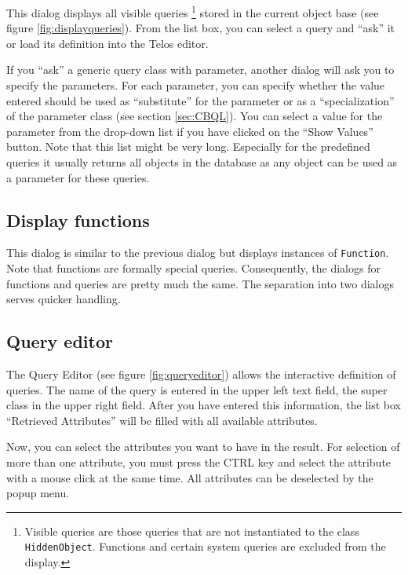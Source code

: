 This dialog displays all visible queries%
\footnote{Visible queries are those queries that are not instantiated to the class
{\tt HiddenObject}. Functions and certain system queries are excluded from the display.}
stored in the current object base (see figure \ref{fig:displayqueries}). 
From the list box, you can
select a query and ``ask'' it or load its definition into the Telos editor.


If you ``ask'' a generic query class with parameter, another dialog will
ask you to specify the parameters. For each parameter, you can specify
whether the value entered should be used as ``substitute'' for the parameter
or as a ``specialization'' of the parameter class (see section \ref{sec:CBQL}).
You can select a value for the parameter from the drop-down list if you have
clicked on the ``Show Values'' button. Note that this list might be very long.
Especially for the predefined queries it usually returns all objects in the database
as any object can be used as a parameter for these queries.

\subsection{Display functions}
\label{sec:display_functions}

This dialog is similar to the previous dialog but displays instances
of {\tt Function}. Note that functions are formally special queries.
Consequently, the dialogs for functions and queries are pretty much the same.
The separation into two dialogs serves quicker handling.


\subsection{Query editor}
\label{sec:query_editor}

The Query Editor (see figure \ref{fig:queryeditor}) allows the interactive definition of queries.
The name of the query is entered in the upper left text field,
the super class in the upper right field. After you have entered
this information, the list box ``Retrieved Attributes'' will be
filled with all available attributes.

Now, you can select the attributes you want to have in the result.
For selection of more than one attribute, you must press the
CTRL key and select the attribute with a mouse click at the same time.
All attributes can be deselected by the popup menu.

